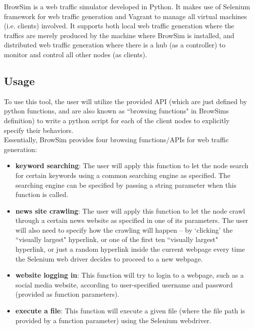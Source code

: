 \documentclass[12pt]{report}
\begin{document}
BrowSim \citep{BrowSim} is a web traffic simulator developed in Python. It makes use of Selenium framework for web traffic generation and Vagrant to manage all virtual machines (i.e. clients) involved. It supports both local web traffic generation where the traffics are merely produced by the machine where BrowSim is installed, and distributed web traffic generation where there is a hub (as a controller) to monitor and control all other nodes (as clients).

\subsection{Usage}

To use this tool, the user will utilize the provided API (which are just defined by python functions, and are also known as ``browsing functions" in BrowSim\textquotesingle s definition) to write a python script for each of the client nodes to explicitly specify their behaviors.\\

Essentially, BrowSim provides four browsing functions/APIs for web traffic generation:

\begin{itemize}
\item \textbf{keyword searching}: The user will apply this function to let the node search for certain keywords using a common searching engine as specified. The searching engine can be specified by passing a string parameter when this function is called.

\item \textbf{news site crawling}: The user will apply this function to let the node crawl through a certain news website as specified in one of its parameters. The user will also need to specify how the crawling will happen -- by ‘clicking’ the ``visually largest" hyperlink, or one of the first ten ``visually largest" hyperlink, or just a random hyperlink inside the current webpage every time the Selenium web driver decides to proceed to a new webpage.

\item \textbf{website logging in}: This function will try to login to a webpage, such as a social media website, according to user-specified username and password (provided as function parameters).

\item \textbf{execute a file}: This function will execute a given file (where the file path is provided by a function parameter) using the Selenium webdriver.

\end{itemize}
\end{document}
